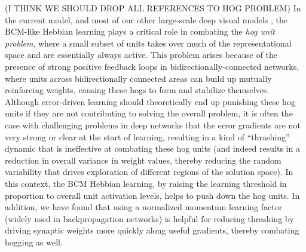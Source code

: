 \documentclass[11pt,twoside]{article}
\newif\myifpdf
\begin{document}
(I THINK WE SHOULD DROP ALL REFERENCES TO HOG PROBLEM) In the current model, and most of our other large-scale deep visual models \cite{OReillyWyatteHerdEtAl13}, the BCM-like Hebbian learning plays a critical role in combating the {\em hog unit problem}, where a small subset of units takes over much of the representational space and are essentially always active.  This problem arises because of the presence of strong positive feedback loops in bidirectionally-connected networks, where units across bidirectionally connected areas can build up mutually reinforcing weights, causing these hogs to form and stabilize themselves.  Although error-driven learning should theoretically end up punishing these hog units if they are not contributing to solving the overall problem, it is often the case with challenging problems in deep networks that the error gradients are not very strong or clear at the start of learning, resulting in a kind of ``thrashing'' dynamic that is ineffective at combating these hog units (and indeed results in a reduction in overall variance in weight values, thereby reducing the random variability that drives exploration of different regions of the solution space).  In this context, the BCM Hebbian learning, by raising the learning threshold in proportion to overall unit activation levels, helps to push down the hog units.  In addition, we have found that using a normalized momentum learning factor (widely used in backpropagation networks) is helpful for reducing thrashing by driving synaptic weights more quickly along useful gradients, thereby combating hogging as well.
\end{document}
